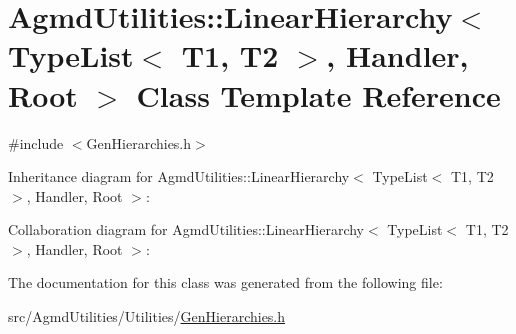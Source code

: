 \hypertarget{class_agmd_utilities_1_1_linear_hierarchy_3_01_type_list_3_01_t1_00_01_t2_01_4_00_01_handler_00_01_root_01_4}{\section{Agmd\+Utilities\+:\+:Linear\+Hierarchy$<$ Type\+List$<$ T1, T2 $>$, Handler, Root $>$ Class Template Reference}
\label{class_agmd_utilities_1_1_linear_hierarchy_3_01_type_list_3_01_t1_00_01_t2_01_4_00_01_handler_00_01_root_01_4}
}


{\ttfamily \#include $<$Gen\+Hierarchies.\+h$>$}



Inheritance diagram for Agmd\+Utilities\+:\+:Linear\+Hierarchy$<$ Type\+List$<$ T1, T2 $>$, Handler, Root $>$\+:


Collaboration diagram for Agmd\+Utilities\+:\+:Linear\+Hierarchy$<$ Type\+List$<$ T1, T2 $>$, Handler, Root $>$\+:


The documentation for this class was generated from the following file\+:\begin{DoxyCompactItemize}
\item 
src/\+Agmd\+Utilities/\+Utilities/\hyperlink{_gen_hierarchies_8h}{Gen\+Hierarchies.\+h}\end{DoxyCompactItemize}

